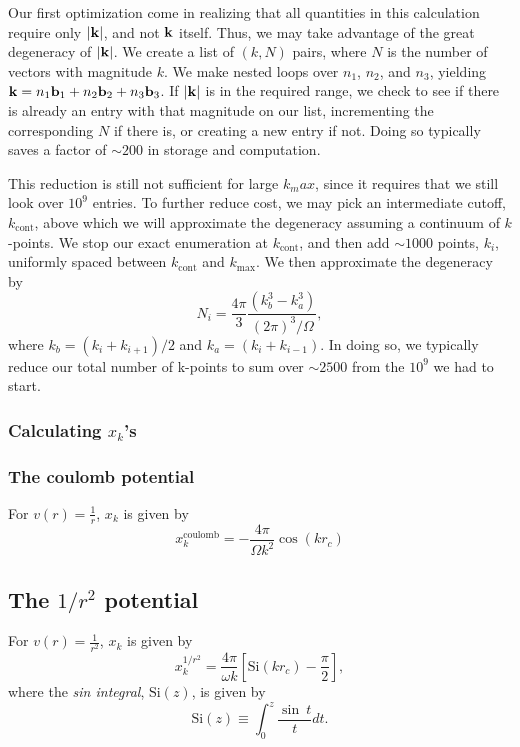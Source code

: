 Our first optimization come in realizing that all quantities in this
calculation require only $|\mathbf{k}|$, and not $\mathbf{k}$ itself.  Thus, we may
take advantage of the great degeneracy of $|\mathbf{k}|$.  We create a list
of $(k,N)$ pairs, where $N$ is the number of vectors with magnitude $k$.
We make nested loops over
$n_1$, $n_2$, and $n_3$, yielding $\mathbf{k} = n_1 \mathbf{b}_1 + n_2 \mathbf{b}_2 + n_3
\mathbf{b}_3$. If $|\mathbf{k}|$ is in the required range, we check to see if there
is already an entry with that magnitude on our list, incrementing the
corresponding $N$ if there is, or creating a new entry if not.  Doing
so typically saves a factor of $\sim 200$ in storage and computation.

This reduction is still not sufficient for large $k_max$, since it
requires that we still look over $10^9$ entries.  To further reduce
cost, we may pick an intermediate cutoff, $k_\text{cont}$, above which
we will approximate the degeneracy assuming a continuum of
$k$-points.  We stop our exact enumeration at $k_\text{cont}$, and
then add $\sim 1000$ points, $k_i$, uniformly spaced between $k_\text{cont}$
and $k_\text{max}$. We then approximate the degeneracy by
\begin{equation}
N_i = \frac{4 \pi}{3} \frac{\left( k_b^3 -k_a^3\right)}{(2\pi)^3/\Omega},
\end{equation}
where $k_b = (k_i + k_{i+1})/2$ and $k_a = (k_i + k_{i-1})$.  In doing
so, we typically reduce our total number of k-points to sum over $\sim
2500$ from the $10^9$ we had to start.

\subsubsection{Calculating $x_k$'s}
\subsubsection*{The coulomb potential}
For $v(r) = \frac{1}{r}$, $x_k$ is given by
\begin{equation}
x_k^{\text{coulomb}} = -\frac{4 \pi}{\Omega k^2} \cos(k r_c)
\end{equation}

\subsection*{The $1/r^2$ potential}
For $v(r) = \frac{1}{r^2}$, $x_k$ is given by
\begin{equation}
x_k^{1/r^2} = \frac{4 \pi}{\omega k} 
\left[ \text{Si}(k r_c) -\frac{\pi}{2}\right],
\end{equation}
where the {\em sin integral}, $\text{Si}(z)$, is given by
\begin{equation}
\text{Si}(z) \equiv \int_0^z \frac{\sin \ t}{t} dt.
\end{equation}

